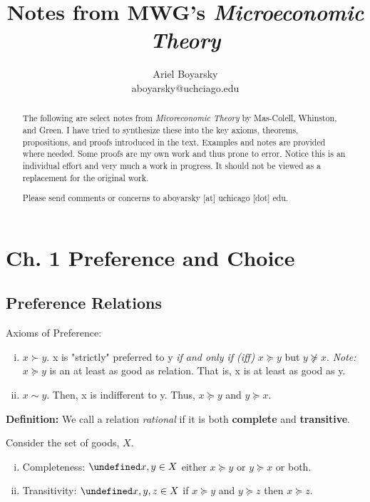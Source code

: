 \documentclass[12pt]{article}
\let\oldforall\forall
\let\forall\undefined
\DeclareMathOperator{\forall}{\,\oldforall\,}
\begin{document}
\title{Notes from MWG's \emph{Microeconomic Theory}} %
\author{Ariel Boyarsky\\ aboyarsky@uchciago.edu} %
 
\maketitle


\begin{abstract}
The following are select notes from \emph{Micoreconomic Theory} by Mas-Colell, Whinston, and Green. I have tried to synthesize these into the key axioms, theorems, propositions, and proofs introduced in the text. Examples and notes are provided where needed. Some proofs are my own work and thus prone to error. Notice this is an individual effort and very much a work in progress. It should not be viewed as a replacement for the original work. 

Please send comments or concerns to aboyarsky [at] uchicago [dot] edu.
\end{abstract}

\section*{Ch. 1 Preference and Choice}
\subsection{Preference Relations}
Axioms of Preference:
\begin{enumerate}[i.]
	\item $x \succ y$. x is "strictly" preferred to y \emph{if and only if (iff)} $x \succeq y$ but $y \not\succeq x$. 
	\emph{Note:} $x \succeq y$ is an at least as good as relation. That is, x is at least as good as y. 
	\item $x \sim y$. Then,  x is indifferent to y. Thus,  $x \succeq y$ and $y \succeq x$.
\end{enumerate}

\textbf{Definition:} We call a relation \emph{rational} if it is both \textbf{complete} and \textbf{transitive}.

Consider the set of goods, $X$.
\begin{enumerate}[i.]
	\item Completeness: $\forall x,y \in X$ either $x \succeq y$ or $y \succeq x$ or both.
	\item Transitivity: $\forall x,y,z \in X$ if $x \succeq y$ and $y \succeq z$ then $x \succeq z$.
\end{enumerate}
\end{document}
